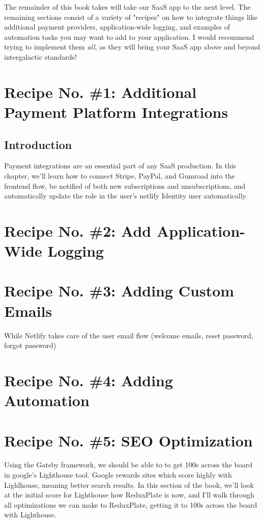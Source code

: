\documentclass[paper=6in:9in,pagesize=pdftex,headinclude=on,footinclude=on,12pt]{scrbook}
\begin{document}
The remainder of this book takes will take our SaaS app to the next level. The remaining sections consist of a variety of "recipes" on how to integrate things like additional payment providers, application-wide logging, and examples of automation tasks you may want to add to your application. I would recommend trying to implement them \textit{all}, as they will bring your SaaS app above and beyond intergalactic standards! \rocket

\chapter{Recipe No. \#1: Additional Payment Platform Integrations}

\section{Introduction}

Payment integrations are an essential part of any SaaS production. In this chapter, we'll learn how to connect Stripe, PayPal, and Gumroad into the frontend flow, be notified of both new subscriptions and unsubscriptions, and automatically update the role in the user's netlify Identity user automatically.

\chapter{Recipe No. \#2: Add Application-Wide Logging}

\chapter{Recipe No. \#3: Adding Custom Emails}

While Netlify takes care of the user email flow (welcome emails, reset password, forgot password)

\chapter{Recipe No. \#4: Adding Automation}

\chapter{Recipe No. \#5: SEO Optimization}


Using the Gatsby framework, we should be able to to get 100s across the board in google's Lighthouse tool. Google rewards sites which score highly with Lighlhouse, meaning better search results. In this section of the book, we'll look at the initial score for Lighthouse how ReduxPlate is now, and I'll walk through all optimizations we can make to ReduxPlate, getting it to 100s across the board with Lighthouse.
\end{document}
